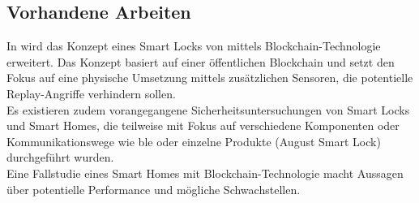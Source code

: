     \newpage
    \subsection{Vorhandene Arbeiten}
    \label{sec:problem_relatedWork}
        In \cite{Han2017} wird das Konzept eines Smart Locks von \cite{Park2009} mittels Blockchain-Technologie erweitert.
        Das Konzept basiert auf einer öffentlichen Blockchain und setzt den Fokus auf eine physische Umsetzung mittels zusätzlichen Sensoren, die potentielle Replay-Angriffe verhindern sollen.
        \medskip\\
        Es existieren zudem vorangegangene Sicherheitsuntersuchungen von Smart Locks \cite{Ho2016,Ye2017} und Smart Homes\cite{Fernandes2016}, die teilweise mit Fokus auf verschiedene Komponenten oder Kommunikationswege wie \gls{ble}\cite{Rose2016} oder einzelne Produkte (August Smart Lock\cite{Fuller2017}) durchgeführt wurden.
        \medskip\\
        Eine Fallstudie eines Smart Homes mit Blockchain-Technologie\cite{Dorri2017} macht Aussagen über potentielle Performance und mögliche Schwachstellen.
